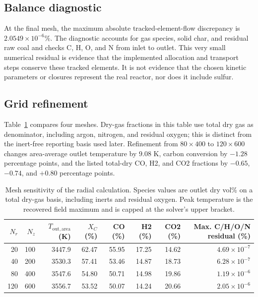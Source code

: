 \documentclass[journal]{IEEEtran}
\begin{document}
\subsection{Balance diagnostic}
At the final mesh, the maximum absolute tracked-element-flow discrepancy is \(2.0549\times10^{-6}\%\). The diagnostic accounts for gas species, solid char, and residual raw coal and checks C, H, O, and N from inlet to outlet. This very small numerical residual is evidence that the implemented allocation and transport steps conserve these tracked elements. It is not evidence that the chosen kinetic parameters or closures represent the real reactor, nor does it include sulfur.

\subsection{Grid refinement}
Table~\ref{tab:grid} compares four meshes. Dry-gas fractions in this table use total dry gas as denominator, including argon, nitrogen, and residual oxygen; this is distinct from the inert-free reporting basis used later. Refinement from \(80\times400\) to \(120\times600\) changes area-average outlet temperature by \(9.08\) K, carbon conversion by \(-1.28\) percentage points, and the listed total-dry CO, H2, and CO2 fractions by \(-0.65\), \(-0.74\), and \(+0.80\) percentage points.

\begin{table}[t]
\caption{Mesh sensitivity of the radial calculation. Species values are outlet dry vol\% on a total dry-gas basis, including inerts and residual oxygen. Peak temperature is the recovered field maximum and is capped at the solver's upper bracket.}
\label{tab:grid}
\centering
\small
\begin{tabular}{rrrrrrrr}
\toprule
\(N_r\) & \(N_z\) & \(T_{\mathrm{out,area}}\) (K) & \(X_C\) (\%) & CO (\%) & H2 (\%) & CO2 (\%) & Max. C/H/O/N residual (\%)\\
\midrule
20 & 100 & 3447.9 & 62.47 & 55.95 & 17.25 & 14.62 & \(4.69\times10^{-7}\)\\
40 & 200 & 3530.3 & 57.41 & 53.46 & 14.87 & 18.73 & \(6.28\times10^{-7}\)\\
80 & 400 & 3547.6 & 54.80 & 50.71 & 14.98 & 19.86 & \(1.19\times10^{-6}\)\\
120 & 600 & 3556.7 & 53.52 & 50.07 & 14.24 & 20.66 & \(2.05\times10^{-6}\)\\
\bottomrule
\end{tabular}
\end{table}
\end{document}
